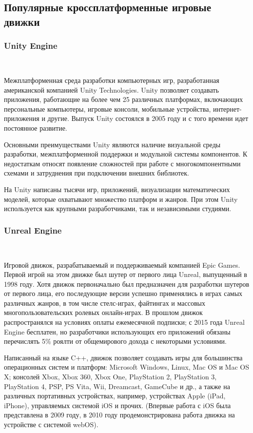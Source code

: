 \subsection{Популярные кроссплатформенные игровые движки}
\label{sub:domain:subsec_game_engines}
\subsubsection{Unity Engine}~
\label{sub:domain:subsec_game_engines:unity}

Межплатформенная среда разработки компьютерных игр, разработанная американской компанией Unity Technologies. Unity позволяет создавать приложения, работающие на более чем 25 различных платформах, включающих персональные компьютеры, игровые консоли, мобильные устройства, интернет-приложения и другие. Выпуск Unity состоялся в 2005 году и с того времени идет постоянное развитие.

Основными преимуществами Unity являются наличие визуальной среды разработки, межплатформенной поддержки и модульной системы компонентов. К недостаткам относят появление сложностей при работе с многокомпонентными схемами и затруднения при подключении внешних библиотек.

На Unity написаны тысячи игр, приложений, визуализации математических моделей, которые охватывают множество платформ и жанров. При этом Unity используется как крупными разработчиками, так и независимыми студиями.


\subsubsection{Unreal Engine}~
\label{sub:domain:subsec_game_engines:unreal}

Игровой движок, разрабатываемый и поддерживаемый компанией Epic Games. Первой игрой на этом движке был шутер от первого лица Unreal, выпущенный в 1998 году. Хотя движок первоначально был предназначен для разработки шутеров от первого лица, его последующие версии успешно применялись в играх самых различных жанров, в том числе стелс-играх, файтингах и массовых многопользовательских ролевых онлайн-играх. В прошлом движок распространялся на условиях оплаты ежемесячной подписки; с 2015 года Unreal Engine бесплатен, но разработчики использующих его приложений обязаны перечислять 5\% роялти от общемирового дохода с некоторыми условиями.

Написанный на языке C++, движок позволяет создавать игры для большинства операционных систем и платформ: Microsoft Windows, Linux, Mac OS и Mac OS X; консолей Xbox, Xbox 360, Xbox One, PlayStation 2, PlayStation 3, PlayStation 4, PSP, PS Vita, Wii, Dreamcast, GameCube и др., а также на различных портативных устройствах, например, устройствах Apple (iPad, iPhone), управляемых системой iOS и прочих. (Впервые работа с iOS была представлена в 2009 году, в 2010 году продемонстрирована работа движка на устройстве с системой webOS).

